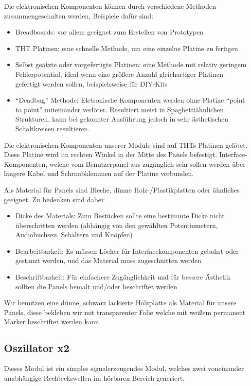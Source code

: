 Die elektronischen Komponenten können durch verschiedene Methoden zusammengeschalten werden, Beispiele dafür sind:
\begin{itemize}
\item Breadboards:
vor allem geeignet zum Erstellen von Prototypen
\item \ac{THT} Platinen:
eine schnelle Methode, um eine einzelne Platine zu fertigen
\item Selbst geätzte oder vorgefertigte Platinen:
eine Methode mit relativ geringem Fehlerpotential, ideal wenn eine größere Anzahl gleichartiger Platinen gefertigt werden sollen, beispielsweise für DIY-Kits
\item "`Deadbug"' Methode:
Eletronische Komponenten werden ohne Platine "`point to point"' miteinander verlötet. Resultiert meist in Spaghettiähnlichen Strukturen, kann bei gekonnter Ausführung jedoch in sehr ästhetischen Schaltkreisen resultieren.
\end{itemize}

Die elektronischen Komponenten unserer Module sind auf \acp{THT} Platinen gelötet. Diese Platine wird im rechten Winkel in der Mitte des Panels befestigt. Interface-Komponenten, welche vom Benutzerpanel aus zugänglich sein sollen werden über längere Kabel und Schraubklemmen auf der Platine verbunden.

Als Material für Panels sind Bleche, dünne Holz-/Plastikplatten oder ähnliches geeignet. Zu bedenken sind dabei:

\begin{itemize}
\item Dicke des Materials:
Zum Bestücken sollte eine bestimmte Dicke nicht überschritten werden (abhängig von den gewählten Potentiometern, Audiobuchsen, Schaltern und Knöpfen)
\item Bearbeitbarkeit:
Es müssen Löcher für Interfacekomponenten gebohrt oder gestanzt werden, und das Material muss zugeschnitten werden
\item Beschriftbarkeit:
Für einfachere Zugänglichkeit und für bessere Ästhetik sollten die Panels bemalt und/oder beschriftet werden
\end{itemize}

Wir benutzen eine dünne, schwarz lackierte Holzplatte als Material für unsere Panels, diese bekleben wir mit transparenter Folie welche mit weißem permanent Marker beschriftet werden kann.

\subsection{Oszillator x2}
\label{sec:orgea62c8f}
Dieses Modul ist ein simples signalerzeugendes Modul, welches zwei voneinander unabhängige Rechteckswellen im hörbaren Bereich generiert.

